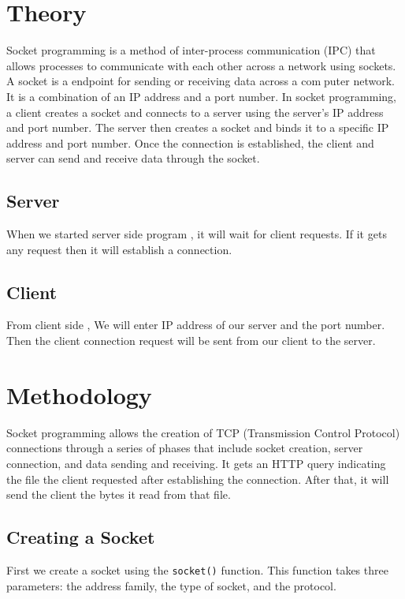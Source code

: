 \documentclass[11pt]{article}
\begin{document}
\section{Theory}
Socket programming is a method of inter-process communication (IPC) that
allows processes to communicate with each other across a network using
sockets. A socket is a endpoint for sending or receiving data across a computer network. It is a combination of an IP address and a port number.
In socket programming, a client creates a socket and connects to a server
using the server’s IP address and port number. The server then creates a
socket and binds it to a specific IP address and port number. Once the
connection is established, the client and server can send and receive data
through the socket.
\subsection{Server}
When we started server side program , it will wait for client requests. If it
gets any request then it will establish a connection.

\subsection{Client}
From client side , We will enter IP address of our server and
the port number. Then the client connection request will be sent from our
client to the server.



\section{Methodology}

Socket programming allows the creation of TCP (Transmission Control Protocol) connections through a series of phases that include socket creation, server connection, and data sending and receiving. It gets an HTTP query indicating the file the client requested after establishing the connection. After that, it will send the client the bytes it read from that file.

\subsection{Creating a Socket}

First we create a socket using the \texttt{socket()} function. This function takes three parameters: the address family, the type of socket, and the protocol.
\end{document}
